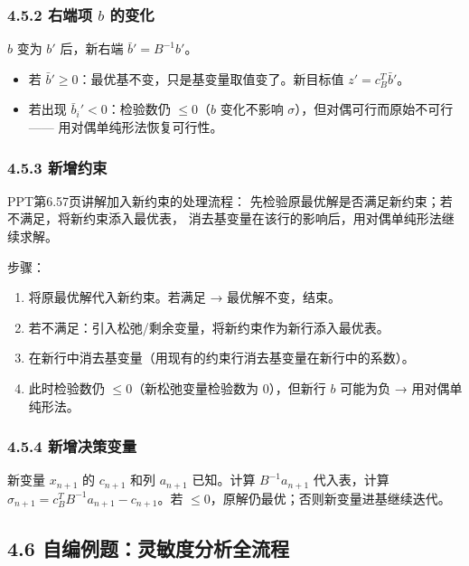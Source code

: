 \subsubsection{4.5.2 右端项 $b$ 的变化}

$b$ 变为 $b'$ 后，新右端 $\bar{b}' = B^{-1} b'$。
\begin{itemize}
  \item 若 $\bar{b}' \ge 0$：最优基不变，只是基变量取值变了。新目标值 $z' = c_B^T \bar{b}'$。
  \item 若出现 $\bar{b}_i' < 0$：检验数仍 $\le 0$（$b$ 变化不影响 $\sigma$），但对偶可行而原始不可行 —— 用对偶单纯形法恢复可行性。
\end{itemize}

\subsubsection{4.5.3 新增约束}

PPT第6.57页讲解加入新约束的处理流程：
先检验原最优解是否满足新约束；若不满足，将新约束添入最优表，
消去基变量在该行的影响后，用对偶单纯形法继续求解。
\medskip

步骤：
\begin{enumerate}
  \item 将原最优解代入新约束。若满足 → 最优解不变，结束。
  \item 若不满足：引入松弛/剩余变量，将新约束作为新行添入最优表。
  \item 在新行中消去基变量（用现有的约束行消去基变量在新行中的系数）。
  \item 此时检验数仍 $\le 0$（新松弛变量检验数为 0），但新行 $b$ 可能为负 → 用对偶单纯形法。
\end{enumerate}

\subsubsection{4.5.4 新增决策变量}

新变量 $x_{n+1}$ 的 $c_{n+1}$ 和列 $a_{n+1}$ 已知。计算 $B^{-1}a_{n+1}$ 代入表，计算 $\sigma_{n+1} = c_B^T B^{-1} a_{n+1} - c_{n+1}$。若 $\le 0$，原解仍最优；否则新变量进基继续迭代。

\subsection{4.6 自编例题：灵敏度分析全流程}

